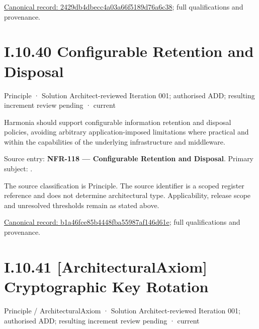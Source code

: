 {\footnotesize \href{../../../../continuum/motivation/principle/architectural-axiom/2429db4dbecc4a03a66f5189d76a6c38.md}{Canonical record: 2429db4dbecc4a03a66f5189d76a6c38}; full qualifications and provenance.}\par
\section*{I.10.40 Configurable Retention and Disposal}
\label{navigation:I.10.40}

\label{element:b1a46fce85b4448fba55987af146d61e}
{\small Principle · Solution Architect-reviewed Iteration 001; authorised ADD; resulting increment review pending · current}\par

Harmonia should support configurable information retention and disposal policies, avoiding arbitrary application-imposed limitations where practical and within the capabilities of the underlying infrastructure and middleware.



Source entry: \textbf{NFR-118 — Configurable Retention and Disposal}. Primary subject: \texttt{}.



The source classification is Principle. The source identifier is a scoped register reference and does not determine architectural type. Applicability, release scope and unresolved thresholds remain as stated above.


{\footnotesize \href{../../../../continuum/motivation/principle/b1a46fce85b4448fba55987af146d61e.md}{Canonical record: b1a46fce85b4448fba55987af146d61e}; full qualifications and provenance.}\par
\section*{I.10.41 [ArchitecturalAxiom] Cryptographic Key Rotation}
\label{navigation:I.10.41}

\label{element:6df99d4979a942fe833e1c43317b385b}
{\small Principle / ArchitecturalAxiom · Solution Architect-reviewed Iteration 001; authorised ADD; resulting increment review pending · current}\par

